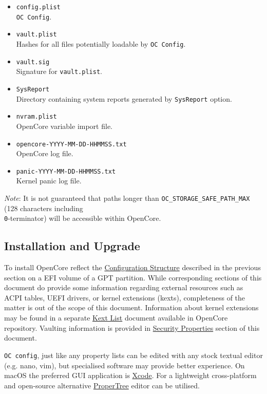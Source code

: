 \documentclass[]{article}
\begin{document}
\begin{itemize}
\item
  \texttt{config.plist} \\
  \texttt{OC Config}.
\item
  \texttt{vault.plist} \\
  Hashes for all files potentially loadable by \texttt{OC Config}.
\item
  \texttt{vault.sig} \\
  Signature for \texttt{vault.plist}.
\item
  \texttt{SysReport} \\
  Directory containing system reports generated by \texttt{SysReport} option.
\item
  \texttt{nvram.plist} \\
  OpenCore variable import file.
\item
  \texttt{opencore-YYYY-MM-DD-HHMMSS.txt} \\
  OpenCore log file.
\item
  \texttt{panic-YYYY-MM-DD-HHMMSS.txt} \\
  Kernel panic log file.
\end{itemize}

\emph{Note}: It is not guaranteed that paths longer than
\texttt{OC\_STORAGE\_SAFE\_PATH\_MAX} (128 characters including
\texttt{\\0}-terminator) will be accessible within OpenCore.

\subsection{Installation and Upgrade}\label{configuration-install}

To install OpenCore reflect the
\hyperref[configuration-structure]{Configuration Structure} described
in the previous section on a EFI volume of a GPT partition. While
corresponding sections of this document do provide some information
regarding external resources such as ACPI tables, UEFI drivers,
or kernel extensions (kexts), completeness of the matter is out of
the scope of this document. Information about kernel extensions may
be found in a separate
\href{https://github.com/acidanthera/OpenCorePkg/blob/master/Docs/Kexts.md}{Kext List}
document available in OpenCore repository. Vaulting information is provided in
\hyperref[miscsecurityprops]{Security Properties} section of this document.

\texttt{OC\ config}, just like any property lists can be edited with any
stock textual editor (e.g. nano, vim), but specialised software may provide
better experience. On macOS the preferred GUI application is
\href{https://developer.apple.com/xcode}{Xcode}. For a lightweight
cross-platform and open-source alternative
\href{https://github.com/corpnewt/ProperTree}{ProperTree} editor can be
utilised.
\end{document}
